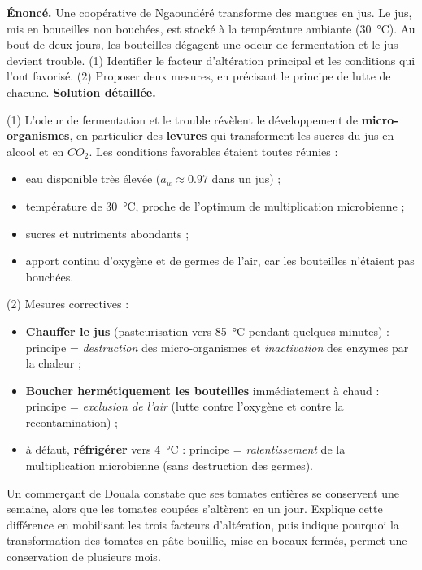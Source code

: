 \documentclass[11pt]{article}
\begin{document}
\begin{exoresolu}
\textbf{Énoncé.} Une coopérative de Ngaoundéré transforme des mangues en jus. Le jus, mis en bouteilles non bouchées, est stocké à la température ambiante (\SI{30}{\celsius}). Au bout de deux jours, les bouteilles dégagent une odeur de fermentation et le jus devient trouble. (1) Identifier le facteur d'altération principal et les conditions qui l'ont favorisé. (2) Proposer deux mesures, en précisant le principe de lutte de chacune.
\tcblower
\textbf{Solution détaillée.}

(1) L'odeur de fermentation et le trouble révèlent le développement de \textbf{micro-organismes}, en particulier des \textbf{levures} qui transforment les sucres du jus en alcool et en $CO_2$. Les conditions favorables étaient toutes réunies :
\begin{itemize}
\item eau disponible très élevée ($a_w \approx \num{0,97}$ dans un jus) ;
\item température de \SI{30}{\celsius}, proche de l'optimum de multiplication microbienne ;
\item sucres et nutriments abondants ;
\item apport continu d'oxygène et de germes de l'air, car les bouteilles n'étaient pas bouchées.
\end{itemize}

(2) Mesures correctives :
\begin{itemize}
\item \textbf{Chauffer le jus} (pasteurisation vers \SI{85}{\celsius} pendant quelques minutes) : principe = \emph{destruction} des micro-organismes et \emph{inactivation} des enzymes par la chaleur ;
\item \textbf{Boucher hermétiquement les bouteilles} immédiatement à chaud : principe = \emph{exclusion de l'air} (lutte contre l'oxygène et contre la recontamination) ;
\item à défaut, \textbf{réfrigérer} vers \SI{4}{\celsius} : principe = \emph{ralentissement} de la multiplication microbienne (sans destruction des germes).
\end{itemize}
\end{exoresolu}

\begin{exercice}
Un commerçant de Douala constate que ses tomates entières se conservent une semaine, alors que les tomates coupées s'altèrent en un jour. Explique cette différence en mobilisant les trois facteurs d'altération, puis indique pourquoi la transformation des tomates en pâte bouillie, mise en bocaux fermés, permet une conservation de plusieurs mois.
\end{exercice}
\end{document}
